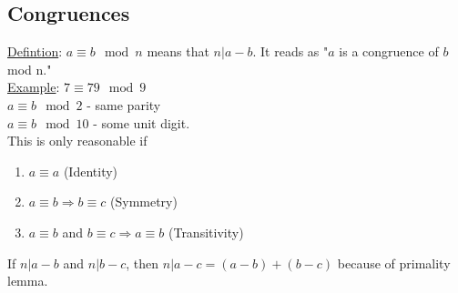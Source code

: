 \documentclass[13pt]{article}
\begin{document}
\subsection*{Congruences}
	\underline{Defintion}: $a \equiv b \mod n$ means that $n | a - b$. It
	reads as "$a$ is a congruence of $b$ mod n."\\
	\underline{Example}: $7 \equiv 79 \mod 9$ \\
	$a \equiv b \mod 2$ - same parity\\
	$a \equiv b \mod 10$ - some unit digit.\\
	This is only reasonable if 
	\begin{enumerate}
		\item $a \equiv a$ (Identity)
		\item $a \equiv b \Rightarrow b \equiv c$ (Symmetry)
		\item $a \equiv b$ and $b \equiv c \Rightarrow a \equiv b$ (Transitivity)
	\end{enumerate}
	If $n | a - b$ and $n | b - c$, then $n | a - c = (a-b) + (b-c)$ because
	of primality lemma.
\end{document}
